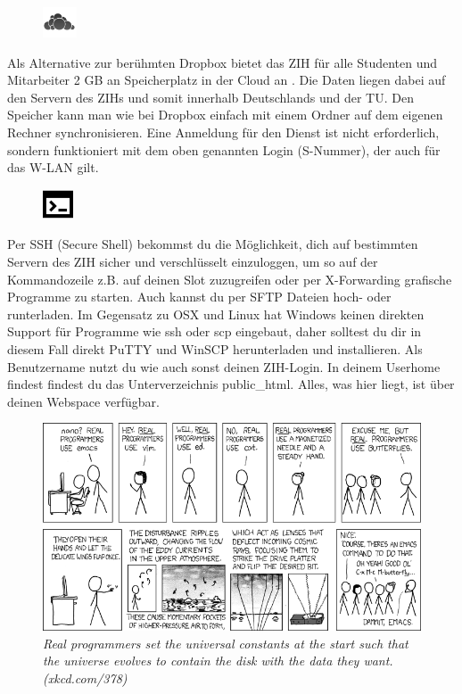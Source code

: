 
\begin{figure}%
  \vspace{-0.5cm}%
  \centering%
  \includegraphics[width=1cm]{img/icons/owncloud.png}%
  \vspace{-0.5cm}%
\end{figure}

Als Alternative zur berühmten Dropbox bietet das ZIH für alle Studenten und Mitarbeiter 2 GB an Speicherplatz in der Cloud an . Die Daten liegen dabei auf den Servern des ZIHs und somit innerhalb Deutschlands und der TU. Den Speicher kann man wie bei Dropbox einfach mit einem Ordner auf dem eigenen Rechner synchronisieren. Eine Anmeldung für den Dienst ist nicht erforderlich, sondern funktioniert mit dem oben genannten Login (S-Nummer), der auch für das W-LAN gilt.


\begin{figure}%
  \vspace{-0.4cm}%
  \centering%
  \includegraphics[width=0.9cm]{img/icons/prompt.pdf}%
  \vspace{-0.4cm}%
\end{figure}

Per SSH (Secure Shell) bekommst du die Möglichkeit, dich auf bestimmten Servern des ZIH sicher und verschlüsselt einzuloggen, um so auf der Kommandozeile z.B. auf deinen Slot zuzugreifen oder per X-Forwarding grafische Programme zu starten.
Auch kannst du per SFTP Dateien hoch- oder runterladen.
Im Gegensatz zu OSX und Linux hat Windows keinen direkten Support für Programme wie ssh oder scp eingebaut, daher solltest du dir in diesem Fall direkt PuTTY und WinSCP herunterladen und installieren.
Als Benutzername nutzt du wie auch sonst deinen ZIH-Login.
In deinem Userhome findest findest du das Unterverzeichnis public\_html.
Alles, was hier liegt, ist über deinen Webspace verfügbar.

\vfill

\begin{figure}[h!]
\centering
\includegraphics[width=\linewidth]{img/xkcd/real_programmers.png}
\caption*{{\small \textit{Real programmers set the universal constants at the start such that the universe evolves to contain the disk with the data they want. (xkcd.com/378)}}}
\end{figure}
